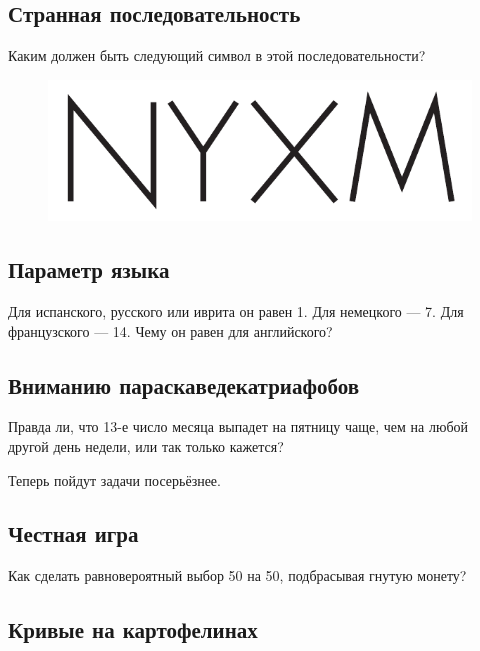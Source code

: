 \subsection*{Странная последовательность}

Каким должен быть следующий символ в этой последовательности?

\begin{figure}[h!]
\centering
\includegraphics[scale=0.5]{pics/ZYXW}
\end{figure}

\subsection*{Параметр языка}

Для испанского, русского или иврита он равен 1.
Для немецкого --- 7.
Для французского --- 14.
Чему он равен для английского?

\subsection*{Вниманию параскаведекатриафобов}

Правда ли, что 13-е число месяца выпадет на пятницу чаще,
чем на любой другой день недели,
или так только кажется?

\medskip

Теперь пойдут задачи посерьёзнее.

\subsection*{Честная игра}

Как сделать равновероятный выбор 50 на 50, подбрасывая гнутую монету?

\subsection*{Кривые на картофелинах}\label{Кривые на картофелинах}

